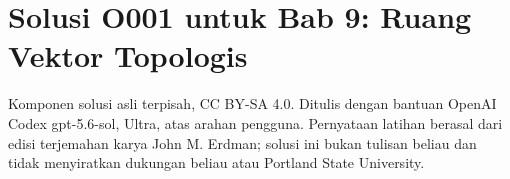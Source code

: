 
\section*{Solusi O001 untuk Bab 9: Ruang Vektor Topologis}
\begin{center}
\small
Komponen solusi asli terpisah, CC BY-SA 4.0. Ditulis dengan bantuan
OpenAI Codex gpt-5.6-sol, Ultra, atas arahan pengguna. Pernyataan latihan
berasal dari edisi terjemahan karya John M. Erdman; solusi ini bukan tulisan
beliau dan tidak menyiratkan dukungan beliau atau Portland State University.
\end{center}

